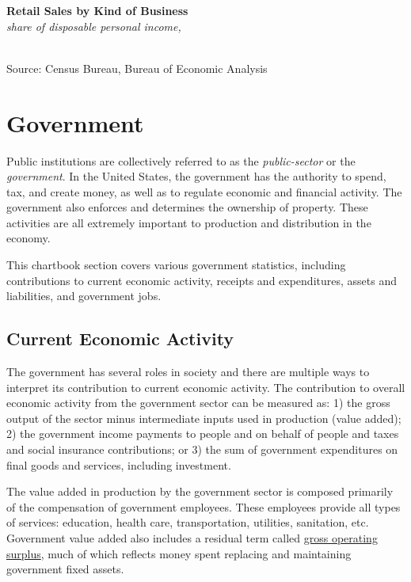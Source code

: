 \documentclass{report}
\newcommand{\tbllink}[1]{\href{https://raw.githubusercontent.com/bdecon/US-chartbook/master/chartbook/data/#1}{\faTable}}
\begin{document}
{\begin{minipage}{0.8\textwidth}
\normalsize \textbf{Retail Sales by Kind of Business}\\
\footnotesize{\textit{share of disposable personal income, }}
\vspace{-1mm}

\hspace*{-2mm} \begin{tikzpicture}

\end{tikzpicture}\\
\footnotesize{Source: Census Bureau, Bureau of Economic Analysis} \hfill \tbllink{rs_ind.csv}
\end{minipage}
\newpage
\begin{minipage}{0.76\textwidth}
\section*{Government}
\hypertarget{gov}{}
\small Public institutions are collectively referred to as the \textit{public-sector} or the \textit{government}. In the United States, the government has the authority to spend, tax, and create money, as well as to regulate economic and financial activity. The government also enforces and determines the ownership of property. These activities are all extremely important to production and distribution in the economy.

This chartbook section covers various government statistics, including contributions to current economic activity, receipts and expenditures, assets and liabilities, and government jobs.
\subsection*{Current Economic Activity}
\small The government has several roles in society and there are multiple ways to interpret its contribution to current economic activity. The contribution to overall economic activity from the government sector can be measured as: 1) the gross output of the sector minus intermediate inputs used in production (value added); 2) the government income payments to people and on behalf of people and taxes and social insurance contributions; or 3) the sum of government expenditures on final goods and services, including investment. 

The value added in production by the government sector is composed primarily of the compensation of government employees. These employees provide all types of services: education, health care, transportation, utilities, sanitation, etc. Government value added also includes a residual term called \href{https://www.bea.gov/help/glossary/gross-operating-surplus}{gross operating surplus}, much of which reflects money spent replacing and maintaining government fixed assets. 
\end{minipage}
\vspace{2mm}

}
\end{document}

